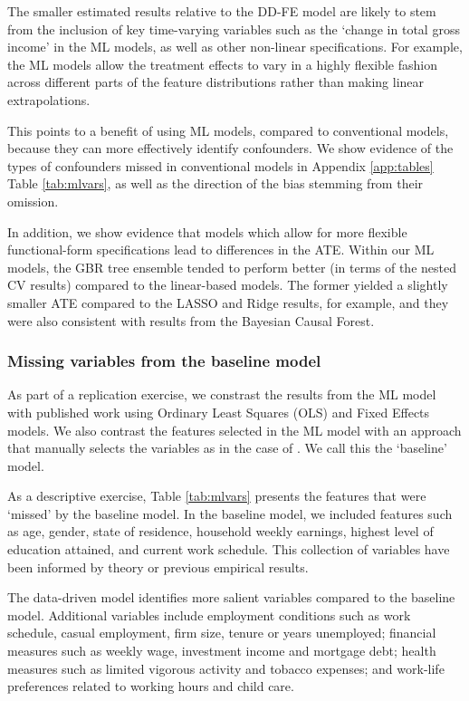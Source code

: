 \documentclass[12pt, a4paper]{article}
\begin{document}
The smaller estimated results relative to the DD-FE model are likely to stem from the inclusion of key time-varying variables such as the `change in total gross income' in the ML models, as well as other non-linear specifications. For example, the ML models allow the treatment effects to vary in a highly flexible fashion across different parts of the feature distributions rather than making linear extrapolations.

This points to a benefit of using ML models, compared to conventional models, because they can more effectively identify confounders. We show evidence of the types of confounders missed in conventional models in Appendix \ref{app:tables} Table \ref{tab:mlvars}, as well as the direction of the bias stemming from their omission. 

In addition, we show evidence that models which allow for more flexible functional-form specifications lead to differences in the ATE. Within our ML models, the GBR tree ensemble tended to perform better (in terms of the nested CV results) compared to the linear-based models. The former yielded a slightly smaller ATE compared to the LASSO and Ridge results, for example, and they were also consistent with results from the Bayesian Causal Forest.

\subsubsection{Missing variables from the baseline model}

As part of a replication exercise, we constrast the results from the ML model with published work using Ordinary Least Squares (OLS) and Fixed Effects models. We also contrast the features selected in the ML model with an approach that manually selects the variables as in the case of \cite{chesters2015}. We call this the `baseline' model.

As a descriptive exercise, Table \ref{tab:mlvars} presents the features that were `missed' by the baseline model. In the baseline model, we included features such as age, gender, state of residence, household weekly earnings, highest level of education attained, and current work schedule. This collection of variables have been informed by theory or previous empirical results.  

The data-driven model identifies more salient variables compared to the baseline model. Additional variables include employment conditions such as work schedule, casual employment, firm size, tenure or years unemployed; financial measures such as weekly wage, investment income and mortgage debt; health measures such as limited vigorous activity and tobacco expenses; and work-life preferences related to working hours and child care. 
\end{document}
